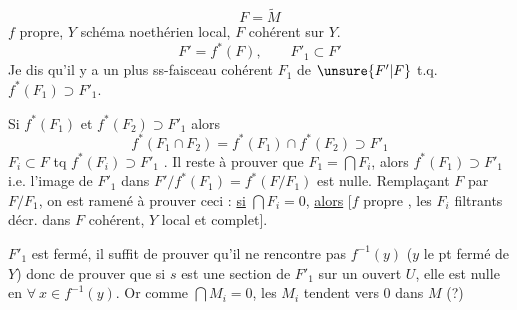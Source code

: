 \[
F=\widetilde M
\]
$f$  propre, $Y$ schéma noethérien local, $F$ cohérent sur $Y$.
\[
F'=f^*(F),\qquad F'_1\subset F'
\]
 Je dis qu'il y a un plus  ss-faisceau cohérent $F_1$ de $\unsure{F'|F}$ t.q. $f^*(F_1)\supset F'_1$.

Si $f^*(F_1)$ et $f^*(F_2)\supset F'_1$ alors
\[
f^*(F_1\cap F_2)=f^*(F_1)\cap f^*(F_2)\supset F'_1
\]
$F_i\subset F$ tq $f^*(F_i)\supset F'_1$  . Il reste à prouver que $F_1=\bigcap F_i$, alors $f^*(F_1)\supset F'_1$ i.e. l'image de $F'_1$ dans $F'/f^*(F_1)=f^*(F/F_1)$ est nulle. Remplaçant $F$ par $F/F_1$, on est ramené à prouver ceci : \uline{si} $\bigcap F_i=0$, \uline{alors}   [$f$ propre , les $F_i$ filtrants décr. dans $F$ cohérent, $Y$ local et complet].

$F'_1$ est fermé, il suffit de prouver qu'il ne rencontre pas $f^{-1}(y)$ ($y$ le pt fermé de $Y$) donc de prouver que si $s$ est une section de $F'_1$ sur un ouvert $U$, elle est nulle en $\forall\ x\in f^{-1}(y)$. Or comme $\bigcap M_i=0$, les $M_i$ tendent vers $0$ dans $M$ (?)

